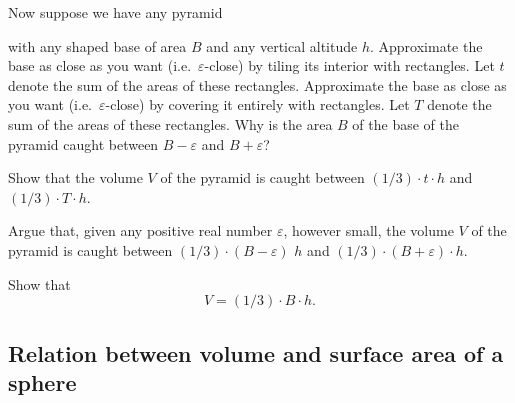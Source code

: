 \documentclass{ximera}
\begin{document}
Now suppose we have any pyramid%
\begin{image}
\end{image}
with any shaped base of area $B$ and any vertical altitude $h$. Approximate
the base as close as you want (i.e.\ $\varepsilon$-close) by tiling its interior
with rectangles. Let $t$ denote the sum of the areas of these rectangles.
Approximate the base as close as you want (i.e.\ $\varepsilon$-close) by
covering it entirely with rectangles. Let $T$ denote the sum of the areas of
these rectangles. Why is the area $B$ of the base of the pyramid caught
between $B-\varepsilon$ and $B+\varepsilon$?

\begin{exercise}
Show that the volume $V$ of the pyramid is caught between
$\left(  1/3\right)  \cdot t\cdot h$ and
$\left(  1/3\right)  \cdot T\cdot h$.
\end{exercise}

\begin{exercise}
Argue that, given any positive real number $\varepsilon$,
however small, the volume $V$ of the pyramid is caught between $\left(
1/3\right)  \cdot \left(  B-\varepsilon\right)  $%
\textperiodcentered$h$ and $\left(  1/3\right)  \cdot \left(
B+\varepsilon\right)  \cdot h$.
\end{exercise}

\begin{exercise}
Show that
\[
V=\left(  1/3\right)  \cdot B\cdot h.
\]
\end{exercise}

\subsection*{Relation between volume and surface area of a sphere}
\end{document}
